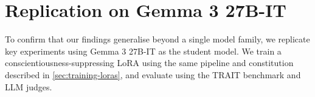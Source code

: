 \section{Replication on Gemma 3 27B-IT}\label{sec:appendix-gemma}

To confirm that our findings generalise beyond a single model family, we replicate key experiments using Gemma 3 27B-IT as the student model. We train a conscientiousness-suppressing LoRA using the same pipeline and constitution described in \cref{sec:training-loras}, and evaluate using the TRAIT benchmark and LLM judges.

